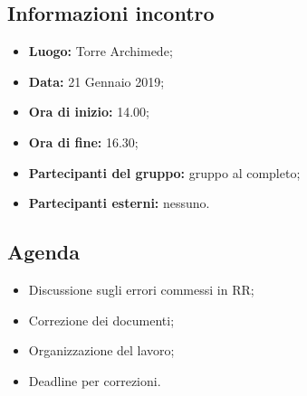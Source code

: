 \subsection{Informazioni incontro}
\begin{itemize}
	\item { \textbf{Luogo:} Torre Archimede};
	\item { \textbf{Data:} 21 Gennaio 2019};
	\item { \textbf{Ora di inizio:} 14.00};
	\item { \textbf{Ora di fine:} 16.30};
	\item { \textbf{Partecipanti del gruppo:} gruppo al completo};
	\item { \textbf{Partecipanti esterni:} nessuno}.
\end{itemize}


\subsection{Agenda}
\begin{itemize}
	\item {Discussione sugli errori commessi in RR;}
	\item {Correzione dei documenti;}
	\item {Organizzazione del lavoro;}
	\item {Deadline per correzioni.}
\end{itemize}

